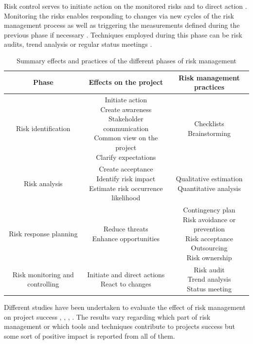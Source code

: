 Risk control serves to initiate action on the monitored risks and to direct action \cite{islamSoftwareDevelopmentRisk2011}. Monitoring the risks enables responding to changes via new cycles of the risk management process as well as triggering the measurements defined during the previous phase if necessary \cite{teschITProjectRisk2007}.  Techniques employed during this phase can be risk audits, trend analysis or regular status meetings \cite{islamSoftwareDevelopmentRisk2011}.
\begin{table}[H]
	\centering
	\caption{Summary effects and practices of the different phases of risk management}
\begin{tabular}{c|c|c} \toprule 
Phase  & Effects on the project & Risk management practices \\ \midrule
 Risk identification & 
 \makecell{Initiate action\\
 	Create awareness\\
 	Stakeholder communication\\
 	Common view on the project\\ 
 	Clarify expectations}&
 \makecell{Checklists\\
 	Brainstorming}\\ \hline
 Risk analysis &
 \makecell{Create acceptance \\
 	Identify risk impact\\
 	Estimate risk occurrence likelihood }&
 \makecell{Qualitative estimation\\
 	Quantitative analysis}\\ \hline
 Risk response planning &
 \makecell{Reduce threats\\
 	Enhance opportunities }&
 \makecell{Contingency plan\\
 	Risk avoidance or prevention\\
 	Risk acceptance\\
 	Outsourcing\\
 	Risk ownership }\\  \hline
 Risk monitoring and controlling &
 \makecell{Initiate and direct actions\\
 	React to changes }&
 \makecell{Risk audit\\
 	Trend analysis\\
 	Status meeting 	
 } \\ \hline
	\end{tabular}
	\label{tab:riskmanagemensummery}
\end{table}
Different studies have been undertaken to evaluate the effect of risk management on project success \cite{debakkerDoesRiskManagement2010}, \cite{didragaRoleEffectsRisk2013}, \cite{kwakProjectRiskManagement2004}, \cite{juniorUnderstandingImpactProject2013}. The results vary regarding which part of risk management or which tools and techniques contribute to projects success but some sort of positive impact is reported from all of them.


